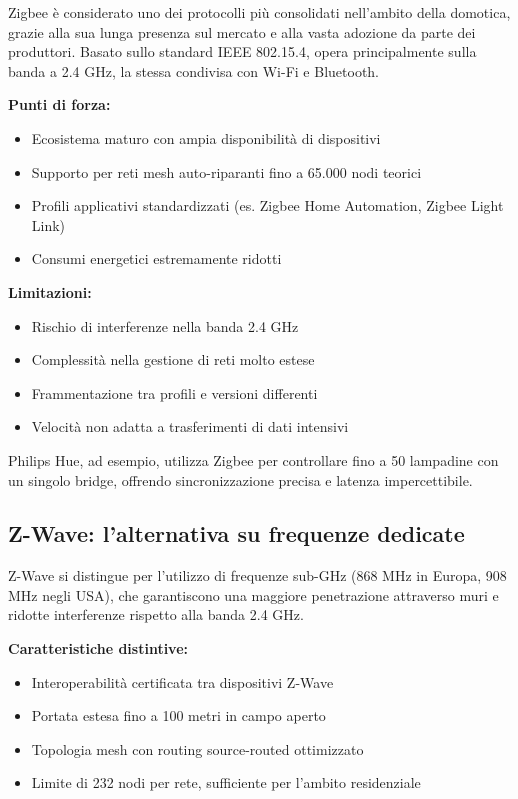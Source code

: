 Zigbee è considerato uno dei protocolli più consolidati nell’ambito della domotica, grazie alla sua lunga presenza sul mercato e alla vasta adozione da parte dei produttori. Basato sullo standard IEEE 802.15.4, opera principalmente sulla banda a 2.4 GHz, la stessa condivisa con Wi-Fi e Bluetooth.

\textbf{Punti di forza:}
\begin{itemize}
    \item Ecosistema maturo con ampia disponibilità di dispositivi
    \item Supporto per reti mesh auto-riparanti fino a 65.000 nodi teorici
    \item Profili applicativi standardizzati (es. Zigbee Home Automation, Zigbee Light Link)
    \item Consumi energetici estremamente ridotti
\end{itemize}

\textbf{Limitazioni:}
\begin{itemize}
    \item Rischio di interferenze nella banda 2.4 GHz
    \item Complessità nella gestione di reti molto estese
    \item Frammentazione tra profili e versioni differenti
    \item Velocità non adatta a trasferimenti di dati intensivi
\end{itemize}

Philips Hue, ad esempio, utilizza Zigbee per controllare fino a 50 lampadine con un singolo bridge, offrendo sincronizzazione precisa e latenza impercettibile.

\subsection{Z-Wave: l'alternativa su frequenze dedicate}

Z-Wave si distingue per l’utilizzo di frequenze sub-GHz (868 MHz in Europa, 908 MHz negli USA), che garantiscono una maggiore penetrazione attraverso muri e ridotte interferenze rispetto alla banda 2.4 GHz.

\textbf{Caratteristiche distintive:}
\begin{itemize}
    \item Interoperabilità certificata tra dispositivi Z-Wave
    \item Portata estesa fino a 100 metri in campo aperto
    \item Topologia mesh con routing source-routed ottimizzato
    \item Limite di 232 nodi per rete, sufficiente per l’ambito residenziale
\end{itemize}

